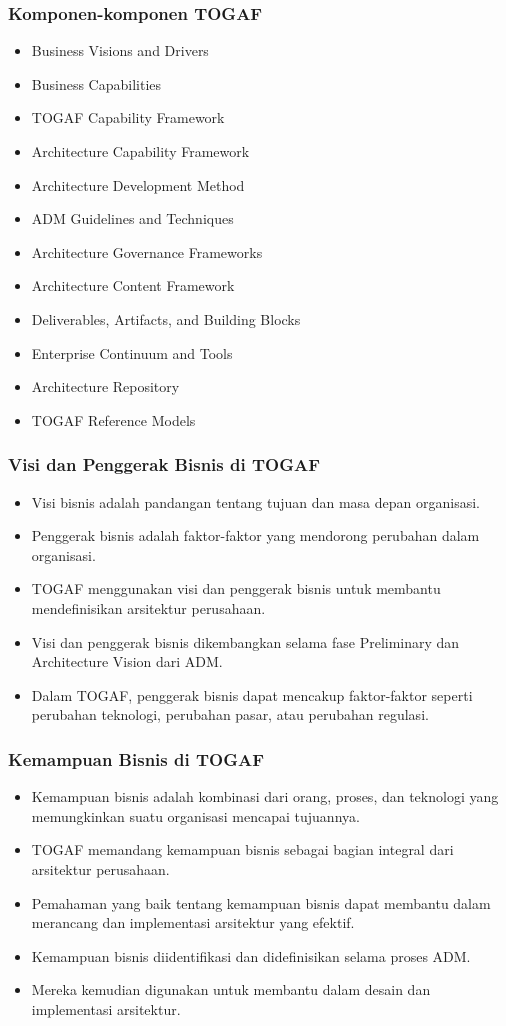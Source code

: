 \documentclass{beamer}
\begin{document}
	\begin{frame}
		\frametitle{Komponen-komponen TOGAF}
		\begin{itemize}
			\item Business Visions and Drivers
			\item Business Capabilities
			\item TOGAF Capability Framework
			\item Architecture Capability Framework
			\item Architecture Development Method
			\item ADM Guidelines and Techniques
			\item Architecture Governance Frameworks
			\item Architecture Content Framework
			\item Deliverables, Artifacts, and Building Blocks
			\item Enterprise Continuum and Tools
			\item Architecture Repository
			\item TOGAF Reference Models
		\end{itemize}
	\end{frame}
	
	\begin{frame}
		\frametitle{Visi dan Penggerak Bisnis di TOGAF}
		\begin{itemize}
			\item Visi bisnis adalah pandangan tentang tujuan dan masa depan organisasi.
			\item Penggerak bisnis adalah faktor-faktor yang mendorong perubahan dalam organisasi.
			\item TOGAF menggunakan visi dan penggerak bisnis untuk membantu mendefinisikan arsitektur perusahaan.
			\item Visi dan penggerak bisnis dikembangkan selama fase Preliminary dan Architecture Vision dari ADM.
			\item Dalam TOGAF, penggerak bisnis dapat mencakup faktor-faktor seperti perubahan teknologi, perubahan pasar, atau perubahan regulasi.
		\end{itemize}
	\end{frame}
	
	\begin{frame}
		\frametitle{Kemampuan Bisnis di TOGAF}
		\begin{itemize}
			\item Kemampuan bisnis adalah kombinasi dari orang, proses, dan teknologi yang memungkinkan suatu organisasi mencapai tujuannya.
			\item TOGAF memandang kemampuan bisnis sebagai bagian integral dari arsitektur perusahaan.
			\item Pemahaman yang baik tentang kemampuan bisnis dapat membantu dalam merancang dan implementasi arsitektur yang efektif.
			\item Kemampuan bisnis diidentifikasi dan didefinisikan selama proses ADM.
			\item Mereka kemudian digunakan untuk membantu dalam desain dan implementasi arsitektur.
		\end{itemize}
	\end{frame}
	
\end{document}
